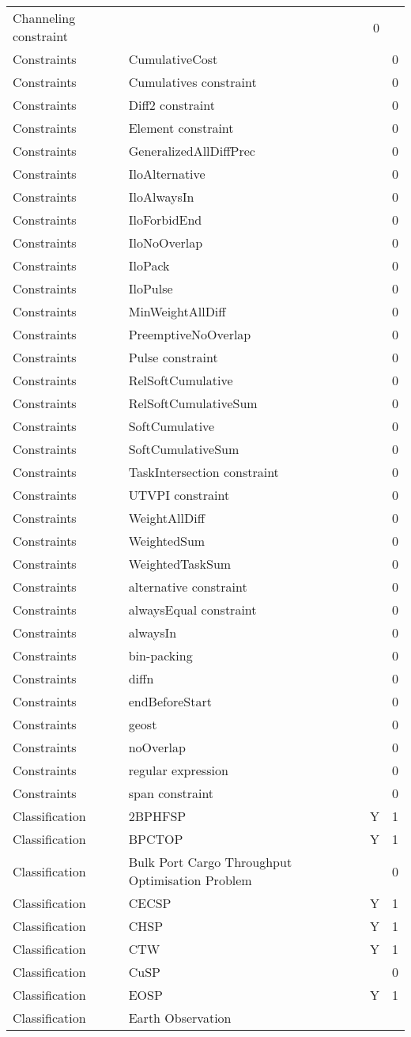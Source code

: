 {\begin{longtable}{lp{10cm}rr}
Channeling constraint &  & 0\\Constraints & CumulativeCost &  & 0\\Constraints & Cumulatives constraint &  & 0\\Constraints & Diff2 constraint &  & 0\\Constraints & Element constraint &  & 0\\Constraints & GeneralizedAllDiffPrec &  & 0\\Constraints & IloAlternative &  & 0\\Constraints & IloAlwaysIn &  & 0\\Constraints & IloForbidEnd &  & 0\\Constraints & IloNoOverlap &  & 0\\Constraints & IloPack &  & 0\\Constraints & IloPulse &  & 0\\Constraints & MinWeightAllDiff &  & 0\\Constraints & PreemptiveNoOverlap &  & 0\\Constraints & Pulse constraint &  & 0\\Constraints & RelSoftCumulative &  & 0\\Constraints & RelSoftCumulativeSum &  & 0\\Constraints & SoftCumulative &  & 0\\Constraints & SoftCumulativeSum &  & 0\\Constraints & TaskIntersection constraint &  & 0\\Constraints & UTVPI constraint &  & 0\\Constraints & WeightAllDiff &  & 0\\Constraints & WeightedSum &  & 0\\Constraints & WeightedTaskSum &  & 0\\Constraints & alternative constraint &  & 0\\Constraints & alwaysEqual constraint &  & 0\\Constraints & alwaysIn &  & 0\\Constraints & bin-packing &  & 0\\Constraints & diffn &  & 0\\Constraints & endBeforeStart &  & 0\\Constraints & geost &  & 0\\Constraints & noOverlap &  & 0\\Constraints & regular expression &  & 0\\Constraints & span constraint &  & 0\\Classification & 2BPHFSP & Y & 1\\Classification & BPCTOP & Y & 1\\Classification & Bulk Port Cargo Throughput Optimisation Problem &  & 0\\Classification & CECSP & Y & 1\\Classification & CHSP & Y & 1\\Classification & CTW & Y & 1\\Classification & CuSP &  & 0\\Classification & EOSP & Y & 1\\Classification & Earth Observation 
\end{longtable}}
